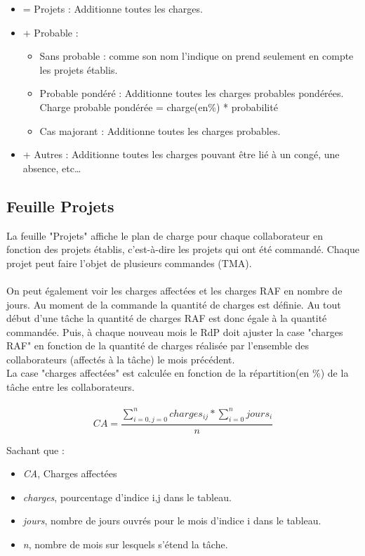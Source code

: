 \documentclass[french]{report}
\begin{document}
\begin{itemize}[label=\textbullet, font=\normalfont \color{blue}]
  \item{=	Projets : Additionne toutes les charges.}
  \item{+	Probable :}
  \begin{itemize}[label=\textbullet]
    \item{Sans probable : comme son nom l’indique on prend seulement en compte
    les projets établis.}
    \item{Probable pondéré : Additionne toutes les charges probables pondérées.
    Charge probable pondérée = charge(en\%) * probabilité}
    \item{Cas majorant : Additionne toutes les charges probables.}
  \end{itemize}
  \item{+ Autres : Additionne toutes les charges pouvant être lié à un congé, une
absence, etc…}
\end{itemize}

\subsection{Feuille Projets}

La feuille "Projets" affiche le plan de charge pour chaque collaborateur en
fonction des projets établis, c’est-à-dire les projets qui ont été commandé.
Chaque projet peut faire l'objet de plusieurs commandes (TMA).\\\\
On peut également voir les charges affectées et les charges RAF en nombre de
jours. Au moment de la commande la quantité de charges est définie. Au tout
début d’une tâche la quantité de charges RAF est donc égale à la quantité commandée.
Puis, à chaque nouveau mois le RdP doit ajuster la case "charges RAF" en fonction de la
quantité de charges réalisée par l’ensemble des collaborateurs (affectés à la
tâche) le mois précédent.\\
La case "charges affectées" est calculée en fonction de la répartition(en \%)
de la tâche entre les collaborateurs.\\\\

\[
CA = \frac{\sum_{i=0,j=0}^n charges_{ij}*\sum_{i=0}^n jours_{i}}{n}
\]

\vspace{0.5cm}

Sachant que :
\begin{itemize}[label=\textbullet, font=\normalfont \color{blue}]
  \item{\emph{CA}, Charges affectées}
  \item{\emph{charges}, pourcentage d'indice i,j dans le tableau.}
  \item{\emph{jours}, nombre de jours ouvrés pour le mois d'indice i dans le tableau.}
  \item{\emph{n}, nombre de mois sur lesquels s'étend la tâche.}
\end {itemize}
\end{document}

